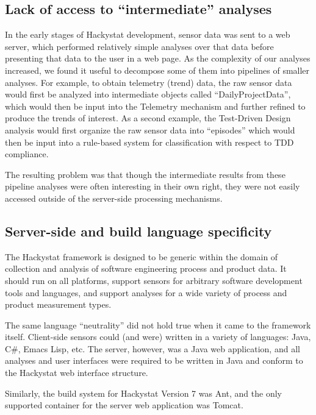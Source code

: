 \documentclass[conference,compsoc,peerreview]{IEEEtran}
\begin{document}
\subsection{Lack of access to ``intermediate'' analyses}

In the early stages of Hackystat development, sensor data was sent to a web
server, which performed relatively simple analyses over that data before
presenting that data to the user in a web page.  As the complexity of our
analyses increased, we found it useful to decompose some of them into
pipelines of smaller analyses.  For example, to obtain telemetry (trend)
data, the raw sensor data would first be analyzed into intermediate objects
called ``DailyProjectData'', which would then be input into the Telemetry
mechanism and further refined to produce the trends of interest.  As a
second example, the Test-Driven Design analysis would first organize the
raw sensor data into ``episodes'' which would then be input into a
rule-based system for classification with respect to TDD compliance.

The resulting problem was that though the intermediate results from these
pipeline analyses were often interesting in their own right, they were not
easily accessed outside of the server-side processing mechanisms.

\subsection{Server-side and build language specificity}

The Hackystat framework is designed to be generic within the domain of
collection and analysis of software engineering process and product data.
It should run on all platforms, support sensors for arbitrary software
development tools and languages, and support analyses for a wide variety of
process and product measurement types.

The same language ``neutrality'' did not hold true when it came to the
framework itself.  Client-side sensors could (and were) written in a
variety of languages: Java, C\#, Emacs Lisp, etc. The server, however, was
a Java web application, and all analyses and user interfaces were required
to be written in Java and conform to the Hackystat web interface structure.

Similarly, the build system for Hackystat Version 7 was Ant, and the only
supported container for the server web application was Tomcat.
\end{document}
